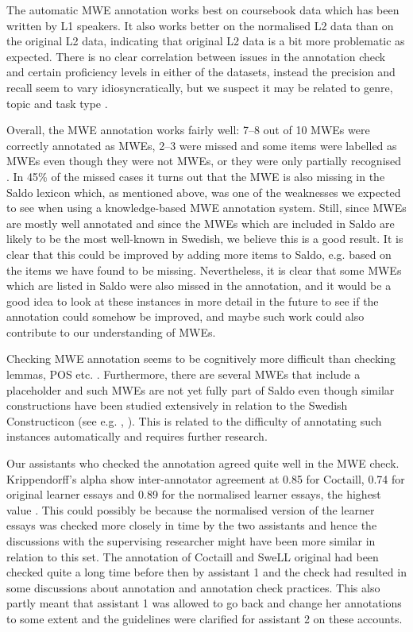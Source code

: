 \documentclass[output=paper,colorlinks,citecolor=brown]{langscibook}
\begin{document}
The automatic MWE annotation works best on coursebook data which has been written by L1 speakers.  
It also works better on the normalised L2 data than on the original L2 data, indicating that original L2 data is a bit more problematic as expected. There is no clear correlation between issues in the annotation check and certain proficiency levels in either of the datasets, instead the precision and recall seem to vary idiosyncratically, but we suspect it may be related to genre, topic and task type 
\citep{volodina2022annotation}. 

Overall, the MWE annotation works fairly well: 7–8 out of 10 MWEs were correctly annotated as MWEs, 2–3 were missed and some items were labelled as MWEs even though they were not MWEs, or they were only partially recognised \citep[158]{volodina2022annotation}.
In 45\% of the missed cases it turns out that the MWE is also missing in the Saldo lexicon \citep[][]{volodina2022annotation}{}{} which, as mentioned above, was one of the weaknesses we expected to see when using a knowledge-based MWE annotation system. 
Still, since MWEs are mostly well annotated and since the MWEs which are included in Saldo are likely to be the most well-known in Swedish, we believe this is a good result.
It is clear that this could be improved by adding more items to Saldo, e.g. based on the items we have found to be missing. 
Nevertheless, it is clear that some MWEs which are listed in Saldo were also missed in the annotation, and it would be a good idea to look at these instances in more detail in the future to see if the annotation could somehow be improved, and maybe such work could also contribute to our understanding of MWEs.

Checking MWE annotation seems to be cognitively more difficult than checking lemmas, POS etc. \citep[][]{volodina2022annotation}{}{}. Furthermore, there are several MWEs that include a placeholder and such MWEs are not yet fully part of Saldo even though similar constructions have been studied extensively in relation to the Swedish Constructicon (see e.g. \citealt{skoldberg2013between}, \citealt{lyngfelt2018constructicography}). This is related to the difficulty of annotating such instances automatically and requires further research.

Our assistants who checked the annotation agreed quite well in the MWE check. Krippendorff’s alpha \citep{krippendorff1980}
show inter-annotator agreement at 0.85 for Coctaill, 0.74 for original learner essays and 0.89 for the normalised learner essays, the highest value \citep{volodina2022annotation}.
This could possibly be because the normalised version of the learner essays was checked more closely in time by the two assistants and hence the discussions with the supervising researcher might have been more similar in relation to this set. The annotation of Coctaill and SweLL original had been checked quite a long time before then by assistant 1 and the check had resulted in some discussions about annotation and annotation check practices. This also partly meant that assistant 1 was allowed to go back and change her annotations to some extent and the guidelines were clarified for assistant 2 on these accounts. 
\end{document}
